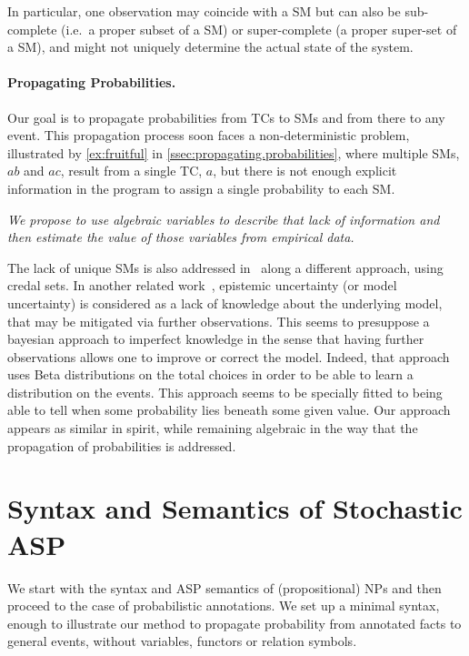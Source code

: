\documentclass[x11names]{tlp}
\renewcommand{\cite}{\citep}
\begin{document}
In particular, one observation may coincide with a \acl{SM} but can also be
sub-complete (i.e.~a proper subset of a \ac{SM}) or super-complete (a proper
super-set of a \ac{SM}), and might not uniquely determine the actual state of
the system.

\paragraph{Propagating Probabilities.}

Our goal is to propagate probabilities from \acp{TC} to \acp{SM} and from
there to any event. This propagation process soon faces a non-deterministic
problem, illustrated by \cref{ex:fruitful} in
\cref{ssec:propagating.probabilities}, where multiple \acp{SM}, $ab$ and
$ac$, result from a single \ac{TC}, $a$, but there is not enough explicit
information in the program to assign a single probability to each \ac{SM}.

\emph{ We propose to use algebraic variables to describe that lack of
	information and then estimate the value of those variables from
	empirical data. }

\bigskip The lack of unique \aclp{SM} is also addressed
in~\cite{cozman2020joy} along a different approach, using credal sets.
In another related work~\cite{verreet2022inference}, epistemic
uncertainty (or model uncertainty) is considered as a lack of
knowledge about the underlying model, that may be mitigated via
further observations.  This seems to presuppose a bayesian approach to
imperfect knowledge in the sense that having further observations
allows one to improve or correct the model.  Indeed, that approach
uses Beta distributions on the total choices in order to be able to
learn a distribution on the events.  This approach seems to be
specially fitted to being able to tell when some probability lies
beneath some given value.  Our approach appears as similar in spirit,
while remaining algebraic in the way that the propagation of
probabilities is addressed.

\section{Syntax and Semantics of Stochastic ASP}
\label{sec:syntax.and.semantics}

We start with the syntax and \ac{ASP} semantics of (propositional) \aclp{NP}
and then proceed to the case of probabilistic annotations. We set up a
minimal syntax, enough to illustrate our method to propagate probability from
annotated facts to general events, without variables, functors or relation
symbols.
\end{document}
